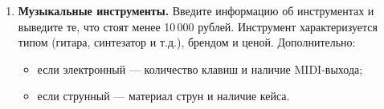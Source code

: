 \begin{enumerate}
    \item \textbf{Музыкальные инструменты.}  
    Введите информацию об инструментах и выведите те, что стоят менее 10\,000 рублей.  
    Инструмент характеризуется типом (гитара, синтезатор и т.д.), брендом и ценой.  
    Дополнительно:
    \begin{itemize}
        \item если электронный — количество клавиш и наличие MIDI-выхода;
        \item если струнный — материал струн и наличие кейса.
    \end{itemize}
\end{enumerate}
